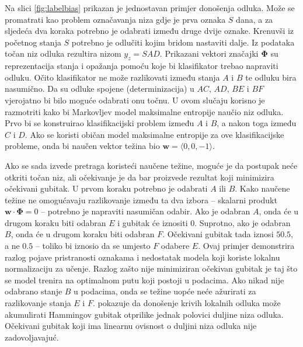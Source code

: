 Na slici \ref{fig:labelbias} prikazan je jednostavan primjer donošenja odluka.
Može se promatrati kao problem označavanja niza gdje je prva oznaka $S$ dana, a
za sljedeća dva koraka potrebno je odabrati između druge dvije oznake. Krenuvši
iz početnog stanja $S$ potrebno je odlučiti kojim bridom nastaviti dalje. Iz
podataka točan niz odluka rezultira nizom $y_z = SAD$. Prikazani vektori
značajki $\mathbf{\Phi}$ su reprezentacija stanja i opažanja pomoću koje bi
klasifikator trebao napraviti odluku. Očito klasifikator ne može razlikovati
između stanja $A$ i $B$ te odluku bira nasumično. Da su odluke spojene
(determinizacija) u $AC$, $AD$, $BE$ i $BF$ vjerojatno bi bilo moguće odabrati
onu točnu. U ovom slučaju korisno je razmotriti kako bi Markovljev model
maksimalne entropije naučio niz odluka. Prvo bi se konstruirao klasifikacijski
problem između $A$ i $B$, a nakon toga između $C$ i $D$. Ako se koristi običan
model maksimalne entropije za ove klasifikacijske probleme, onda bi naučen
vektor težina bio $\mathbf{w} = \langle 0,0,-1 \rangle$.

Ako se sada izvede pretraga koristeći naučene težine, moguće je da postupak neće
otkriti točan niz, ali očekivanje je da bar proizvede rezultat koji minimizira
očekivani gubitak. U prvom koraku potrebno je odabrati $A$ ili $B$. Kako naučene
težine ne omogućavaju razlikovanje između ta dva izbora -- skalarni produkt
$\mathbf{w} \cdot \mathbf{\Phi} = 0$ -- potrebno je napraviti nasumičan odabir.
Ako je odabran $A$, onda će u drugom koraku biti odabran $E$ i gubitak će
iznositi 0. Suprotno, ako je odabran $B$, onda će u drugom koraku biti odabran
$F$. Očekivani gubitak tada iznosi $50.5$, a ne $0.5$ -- toliko bi iznosio da se
umjesto $F$ odabere $E$. Ovaj primjer demonstrira razlog pojave pristranosti
oznakama i nedostatak modela koji koriste lokalnu normalizaciju za učenje.
Razlog zašto nije minimiziran očekivan gubitak je taj što se model trenira na
optimalnom putu koji postoji u podacima. Ako nikad nije odabrano stanje $B$ u
podacima, onda se težine uopće neće ažurirati za razlikovanje stanja $E$ i $F$.
\citet{kaariainen2006lower} pokazuje da donošenje krivih lokalnih odluka može
akumulirati Hammingov gubitak otprilike jednak polovici duljine niza odluka.
Očekivani gubitak koji ima linearnu ovisnost o duljini niza odluka nije
zadovoljavajuć.

